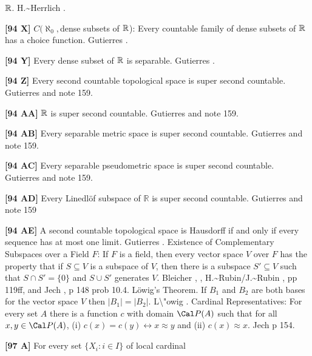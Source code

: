 $\Bbb R$.  \ac{H.~Herrlich} \cite{2001}.
\smallskip
\item{}{\bf [94 X]} $C(\aleph_0,$dense subsets of $\Bbb R$): Every
countable family of dense subsets of $\Bbb R$ has a choice function.
\ac{Gutierres} \cite{2004}.
\smallskip
\item{}{\bf [94 Y]} Every dense subset of $\Bbb R$ is separable.
\ac{Gutierres} \cite{2004}.
\smallskip
\item{}{\bf [94 Z]} Every second countable topological space is
super second countable.  \ac{Gutierres}
\cite{2004} and note 159.
\smallskip
\item{}{\bf [94 AA]} $\Bbb R$ is super second countable.
\ac{Gutierres} \cite{2004} and note 159.
\smallskip
\item{}{\bf [94 AB]} Every separable metric space is super
second countable.  \ac{Gutierres} \cite{2004} and  note 159. 
\smallskip
\item{}{\bf [94 AC]} Every separable pseudometric space is super
second countable. \ac{Gutierres} and note 159. \cite{2004}
\smallskip
\item{}{\bf [94 AD]} Every Linedl\"of subspace of ${\mathbb R}$ is
super second countable. \ac{Gutierres} \cite{2004} and note 159
\smallskip
\item{}{\bf [94 AE]} A second countable topological space is Hausdorff if
and only if every sequence has at most one limit.  \ac{Gutierres}
\cite{2004}.
\medskip
{} Existence of Complementary Subspaces over
a Field $F$: If $F$ is a field, then every vector space $V$ over $F$
has the property that if $S\subseteq V$ is a subspace of $V$, then there
is a subspace $S'\subseteq V$ such that $S\cap S'= \{0\}$ and $S\cup S'$
generates $V$. \ac{Bleicher} \cite{1964}, \cite{1965},
\ac{H.~Rubin/J.~Rubin} \cite{1985}, pp 119ff, and \ac{Jech} \cite{1973b},
p 148 prob 10.4.
\medskip
{} L\"owig's Theorem. If $B_{1}$ and $B_{2}$ are
both bases for the vector space $V$ then $|B_{1}| = |B_{2}|$. \ac{L\"owig}
\cite{1934}. 
\medskip
{} Cardinal Representatives: For every set $A$ there
is a function $c$ with domain ${\Cal P}(A)$ such that for all $x, y\in
{\Cal P}(A)$, (i) $c(x) = c(y) \leftrightarrow x\approx y$
and (ii) $c(x)\approx x$.  \ac{Jech} \cite{1973b} p 154.
\smallskip
\item{}{\bf [97 A]} For every set $\{X_i: i\in I\}$ of local cardinal
